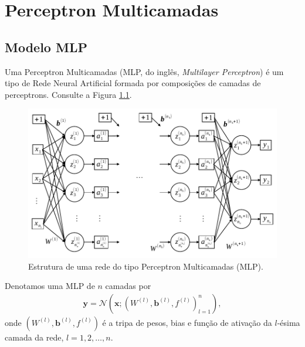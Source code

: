 
\chapter{Perceptron Multicamadas}\label{cap_mlp}
\thispagestyle{fancy}

\section{Modelo MLP}\label{cap_mlp_sec_modelo}

Uma Perceptron Multicamadas (MLP, do inglês, \textit{Multilayer Perceptron}) é um tipo de Rede Neural Artificial formada por composições de camadas de perceptrons. Consulte a Figura \ref{cap_mlp_sec_modelo}.

\begin{figure}[H]
  \centering
  \includegraphics[width=\textwidth]{./cap_mlp/dados/fig_mlp/fig}
  \caption{Estrutura de uma rede do tipo Perceptron Multicamadas (MLP).}
  \label{fig:cap_mlp_sec_modelo:fig:mlp}
\end{figure}

Denotamos uma MLP de $n$ camadas por
\begin{align}
  \pmb{y} = \mathcal{N}\left(\pmb{x}; \left(W^{(l)}, \pmb{b}^{(l)}, f^{(l)}\right)_{l=1}^{n}\right),
\end{align}
onde $\left(W^{(l)}, \pmb{b}^{(l)}, f^{(l)}\right)$ é a tripa de pesos, bias e função de ativação da $l$-ésima camada da rede, $l=1, 2, \dotsc, n$.

